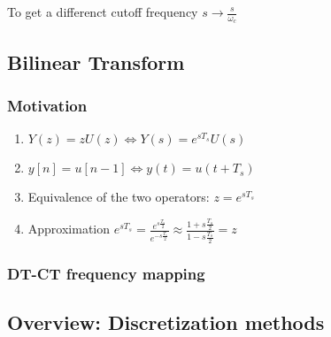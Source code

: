 \documentclass[8pt,a4paper]{scrartcl}
\begin{document}
\begin{multicols*}{3}
To get a differenct cutoff frequency $s\rightarrow\frac{s}{\omega_c}$

\subsection{Bilinear Transform}


\subsubsection{Motivation}

\begin{enumerate}
\ncompaq
\item $Y(z)=zU(z)\Leftrightarrow Y(s)=e^{sT_s}U(s)$
\item $y[n]=u[n-1]\Leftrightarrow y(t)=u(t+T_s)$
\item Equivalence of the two operators: $z=e^{sT_s}$
\item Approximation $e^{sT_s}=\frac{e^{s\frac{T_s}{2}}}{e^{-s\frac{T_s}{2}}}\approx\frac{1+s\frac{T_s}{2}}{1-s\frac{T_s}{2}}=z$

\end{enumerate}

\subsubsection{DT-CT frequency mapping}





\subsection{Overview: Discretization methods}


\end{multicols*}
\end{document}
